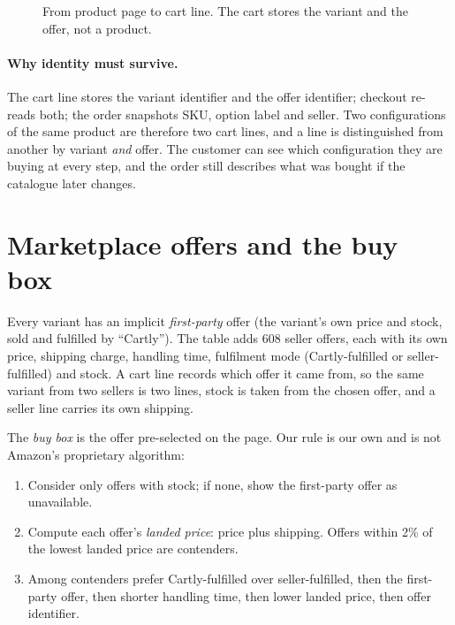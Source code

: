 \begin{figure}[H]
\centering
{}
\caption{From product page to cart line. The cart stores the variant and the offer, not a product.}
\label{fig:variantflow}
\end{figure}

\paragraph{Why identity must survive.} The cart line stores the variant identifier and the offer identifier; checkout re-reads both; the order snapshots SKU, option label and seller. Two configurations of the same product are therefore two cart lines, and a line is distinguished from another by variant \emph{and} offer. The customer can see which configuration they are buying at every step, and the order still describes what was bought if the catalogue later changes. \tagimpl{} \tagtest{}

\section{Marketplace offers and the buy box}

Every variant has an implicit \emph{first-party} offer (the variant's own price and stock, sold and fulfilled by ``Cartly''). The  table adds 608 seller offers, each with its own price, shipping charge, handling time, fulfilment mode (Cartly-fulfilled or seller-fulfilled) and stock. A cart line records which offer it came from, so the same variant from two sellers is two lines, stock is taken from the chosen offer, and a seller line carries its own shipping. \tagimpl{} \tagtest{}

The \emph{buy box} is the offer pre-selected on the page. Our rule is our own and is not Amazon's proprietary algorithm:

\begin{enumerate}
\item Consider only offers with stock; if none, show the first-party offer as unavailable.
\item Compute each offer's \emph{landed price}: price plus shipping. Offers within 2\% of the lowest landed price are contenders.
\item Among contenders prefer Cartly-fulfilled over seller-fulfilled, then the first-party offer, then shorter handling time, then lower landed price, then offer identifier.
\end{enumerate}

